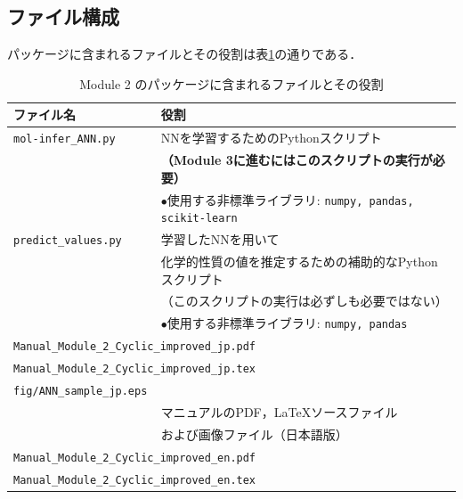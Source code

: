 \documentclass[11pt, titlepage, dvipdfmx, twoside]{jarticle}
\newcommand{\tabref}[1]{表\ref{tab:#1}}
\begin{document}
\subsection{ファイル構成}
パッケージに含まれるファイルとその役割は\tabref{files}の通りである．
\begin{table}[h!]
  \centering
  \caption{Module 2 のパッケージに含まれるファイルとその役割}
  \label{tab:files}
  \begin{tabular}{lcll}
  \hline
  \bf ファイル名 &\ \ & \multicolumn{2}{l}{\bf 役割}\\
  \hline
  \verb|mol-infer_ANN.py| && \multicolumn{2}{l}{NNを学習するためのPythonスクリプト}\\
  &&\multicolumn{2}{l}{\bf （Module 3に進むにはこのスクリプトの実行が必要）}\\
  &&\multicolumn{2}{l}{$\bullet$使用する非標準ライブラリ: {\tt numpy, pandas, scikit-learn}}\\
  \hline
  \verb|predict_values.py| && \multicolumn{2}{l}{学習したNNを用いて}\\
  &&\multicolumn{2}{l}{化学的性質の値を推定するための補助的なPythonスクリプト}\\
  &&\multicolumn{2}{l}{（このスクリプトの実行は必ずしも必要ではない）}\\
  &&\multicolumn{2}{l}{$\bullet$使用する非標準ライブラリ: {\tt numpy, pandas}}\\
  \hline
  \multicolumn{4}{l}{\tt Manual\_Module\_2\_Cyclic\_improved\_jp.pdf}\\
  \multicolumn{4}{l}{\tt Manual\_Module\_2\_Cyclic\_improved\_jp.tex}\\
  \multicolumn{4}{l}{\tt fig/ANN\_sample\_jp.eps}\\
  &&\multicolumn{2}{l}{マニュアルのPDF，\LaTeX ソースファイル}\\
  &&\multicolumn{2}{l}{および画像ファイル（日本語版）}\\
  \hline
  \multicolumn{4}{l}{\tt Manual\_Module\_2\_Cyclic\_improved\_en.pdf}\\
  \multicolumn{4}{l}{\tt Manual\_Module\_2\_Cyclic\_improved\_en.tex}\\

\end{tabular}
\end{table}
\end{document}
